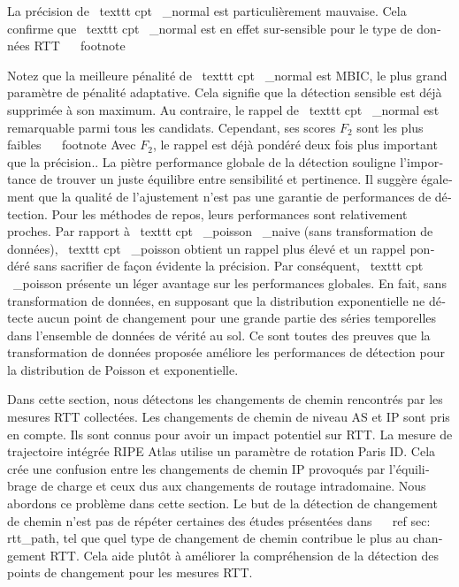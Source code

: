 \begin{otherlanguage}{french}
{La précision de \ texttt {cpt \ _normal} est particulièrement mauvaise.
Cela confirme que \ texttt {cpt \ _normal} est en effet sur-sensible pour le type de données RTT ~ \ footnote {Notez que la meilleure pénalité de \ texttt {cpt \ _normal} est MBIC, le plus grand paramètre de pénalité adaptative. Cela signifie que la détection sensible est déjà supprimée à son maximum.
Au contraire, le rappel de \ texttt {cpt \ _normal} est remarquable parmi tous les candidats.
Cependant, ses scores $ F_2 $ sont les plus faibles ~ \ footnote {Avec $ F_2 $, le rappel est déjà pondéré deux fois plus important que la précision.}.
La piètre performance globale de la détection souligne l'importance de trouver un juste équilibre entre sensibilité et pertinence.
Il suggère également que la qualité de l'ajustement n'est pas une garantie de performances de détection.
Pour les méthodes de repos, leurs performances sont relativement proches.
Par rapport à \ texttt {cpt \ _poisson \ _naive} (sans transformation de données), \ texttt {cpt \ _poisson} obtient un rappel plus élevé et un rappel pondéré sans sacrifier de façon évidente la précision.
Par conséquent, \ texttt {cpt \ _poisson} présente un léger avantage sur les performances globales.
En fait, sans transformation de données, en supposant que la distribution exponentielle ne détecte aucun point de changement pour une grande partie des séries temporelles dans l'ensemble de données de vérité au sol.
Ce sont toutes des preuves que la transformation de données proposée améliore les performances de détection pour la distribution de Poisson et exponentielle.

Dans cette section, nous détectons les changements de chemin rencontrés par les mesures RTT collectées.
Les changements de chemin de niveau AS et IP sont pris en compte.
Ils sont connus pour avoir un impact potentiel sur RTT.
La mesure de trajectoire intégrée RIPE Atlas utilise un paramètre de rotation Paris ID.
Cela crée une confusion entre les changements de chemin IP provoqués par l'équilibrage de charge et ceux dus aux changements de routage intradomaine.
Nous abordons ce problème dans cette section.
Le but de la détection de changement de chemin n'est pas de répéter certaines des études présentées dans ~ \ ref {sec: rtt_path},
tel que quel type de changement de chemin contribue le plus au changement RTT.
Cela aide plutôt à améliorer la compréhension de la détection des points de changement pour les mesures RTT.

}}
\end{otherlanguage}
